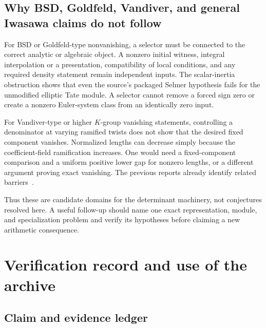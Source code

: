 \subsection{Why BSD, Goldfeld, Vandiver, and general Iwasawa claims do not follow}

For BSD or Goldfeld-type nonvanishing, a selector must be connected to
the correct analytic or algebraic object. A nonzero initial witness,
integral interpolation or a presentation, compatibility of local
conditions, and any required density statement remain independent
inputs. The scalar-inertia obstruction shows that even the source's
packaged Selmer hypothesis fails for the unmodified elliptic Tate module.
A selector cannot remove a forced sign zero or create a nonzero
Euler-system class from an identically zero input.

For Vandiver-type or higher \(K\)-group vanishing statements, controlling
a denominator at varying ramified twists does not show that the desired
fixed component vanishes. Normalized lengths can decrease simply
because the coefficient-field ramification increases. One would need
a fixed-component comparison and a uniform positive lower gap for
nonzero lengths, or a different argument proving exact vanishing.
The previous reports already identify related barriers~\cite{prior}.

Thus these are candidate domains for the determinant machinery, not
conjectures resolved here. A useful follow-up should name one exact
representation, module, and specialization problem and verify its
hypotheses before claiming a new arithmetic consequence.

\section{Verification record and use of the archive}
\label{sec:repro}

\subsection{Claim and evidence ledger}


